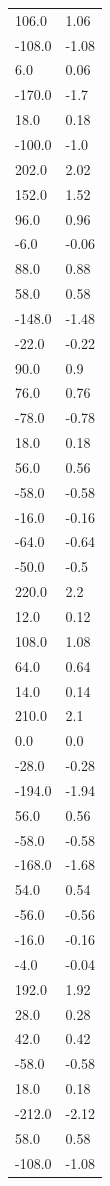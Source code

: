 \begin{longtable}{ll}
106.0 & 1.06 \\
-108.0 & -1.08 \\
6.0 & 0.06 \\
-170.0 & -1.7 \\
18.0 & 0.18 \\
-100.0 & -1.0 \\
202.0 & 2.02 \\
152.0 & 1.52 \\
96.0 & 0.96 \\
-6.0 & -0.06 \\
88.0 & 0.88 \\
58.0 & 0.58 \\
-148.0 & -1.48 \\
-22.0 & -0.22 \\
90.0 & 0.9 \\
76.0 & 0.76 \\
-78.0 & -0.78 \\
18.0 & 0.18 \\
56.0 & 0.56 \\
-58.0 & -0.58 \\
-16.0 & -0.16 \\
-64.0 & -0.64 \\
-50.0 & -0.5 \\
220.0 & 2.2 \\
12.0 & 0.12 \\
108.0 & 1.08 \\
64.0 & 0.64 \\
14.0 & 0.14 \\
210.0 & 2.1 \\
0.0 & 0.0 \\
-28.0 & -0.28 \\
-194.0 & -1.94 \\
56.0 & 0.56 \\
-58.0 & -0.58 \\
-168.0 & -1.68 \\
54.0 & 0.54 \\
-56.0 & -0.56 \\
-16.0 & -0.16 \\
-4.0 & -0.04 \\
192.0 & 1.92 \\
28.0 & 0.28 \\
42.0 & 0.42 \\
-58.0 & -0.58 \\
18.0 & 0.18 \\
-212.0 & -2.12 \\
58.0 & 0.58 \\
-108.0 & -1.08 \\

\end{longtable}
